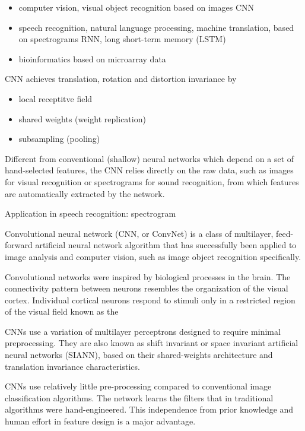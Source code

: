 \documentclass{article}
\begin{document}
\begin{itemize}
\item computer vision, visual object recognition based on images CNN
\item speech recognition, natural language processing, machine translation, 
based on spectrograms RNN, long short-term memory (LSTM)
\item bioinformatics based on microarray data
\end{itemize}



CNN achieves translation, rotation and distortion invariance by
\begin{itemize}
\item local receptitve field
\item shared weights (weight replication)
\item subsampling (pooling)
\end{itemize}

Different from conventional (shallow) neural networks which depend on a 
set of hand-selected features, the CNN relies directly on the raw data, 
such as images for visual recognition or spectrograms for sound recognition,
from which features are automatically extracted by the network.

Application in speech recognition: spectrogram


Convolutional neural network (CNN, or ConvNet) is a class of multilayer,
feed-forward artificial neural network algorithm that has successfully 
been applied to image analysis and computer vision, such as image object 
recognition specifically.

Convolutional networks were inspired by biological processes in the brain.
The connectivity pattern between neurons resembles the organization of the 
visual cortex. Individual cortical neurons respond to stimuli only in a 
restricted region of the visual field known as the



CNNs use a variation of multilayer perceptrons designed to require minimal 
preprocessing. They are also known as shift invariant or space invariant 
artificial neural networks (SIANN), based on their shared-weights architecture
and translation invariance characteristics.


CNNs use relatively little pre-processing compared to conventional image 
classification algorithms. The network learns the filters that in traditional
algorithms were hand-engineered. This independence from prior knowledge and 
human effort in feature design is a major advantage.
\end{document}
